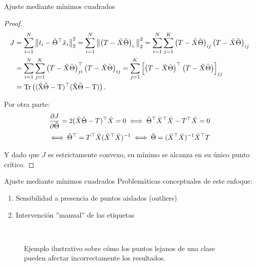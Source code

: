 \documentclass[9pt]{beamer}
\begin{document}
\begin{frame}{Ajuste mediante mínimos cuadrados}

\begin{proof}
\begin{align*}
  J &= \sum_{i=1}^N \norm{t_i - \tilde{\Theta}^\top\tx_i}_2^2 = \sum_{i=1}^N \norm{\left(T - \tX\tilde{\Theta}\right)_{i\cdot}}_2^2 = \sum_{i=1}^N \sum_{j=1}^K \left(T - \tX\tilde{\Theta}\right)_{ij} \left(T - \tX\tilde{\Theta}\right)_{ij}\\
  &= \sum_{i=1}^N \sum_{j=1}^K \left(T - \tX\tilde{\Theta}\right)^\top_{ji} \left(T - \tX\tilde{\Theta}\right)_{ij} =  \sum_{j=1}^K \left[\left(T - \tX\tilde{\Theta}\right)^\top \left(T - \tX\tilde{\Theta}\right)\right]_{jj}\\
  &=\operatorfont{Tr} \left((\tX\tilde{\Theta}-T)^\top (\tX\tilde{\Theta}-T)\right).
\end{align*}
  
Por otra parte:
\begin{equation*}
  \frac{\partial J}{\partial\tilde{\Theta}} = 2(\tilde{X}\tilde{\Theta}-T)^\top\tilde{X}=0 \iff \tilde{\Theta}^\top\tilde{X}^\top\tilde{X} - T^\top\tilde{X} = 0 
\end{equation*}
\begin{equation*}
\iff \tilde{\Theta}^\top = T^\top\tilde{X}(\tilde{X}^\top\tilde{X})^{-1}\iff \tilde{\Theta} = (\tilde{X}^\top\tilde{X})^{-1}\tilde{X}^\top T
\end{equation*}
  
Y dado que $J$ es estrictamente convexo, su mínimo se alcanza en su único punto crítico.  

\end{proof}


\end{frame}

\begin{frame}{Ajuste mediante mínimos cuadrados}
Problemáticas conceptuales de este enfoque: 
\begin{enumerate}
  \item Sensibilidad a presencia de puntos aislados (outliers) \pause
  \item Intervención ''manual'' de las etiquetas \pause
\end{enumerate}
\begin{figure}[H]
  \centering
  \\
  \caption{Ejemplo ilustrativo sobre cómo los puntos lejanos de una clase pueden afectar incorrectamente los resultados.}
  \label{fig:clasif_mse}
\end{figure}


\end{frame}

\begin{frame}
  \titlepage
\end{frame}



%
\end{document}
